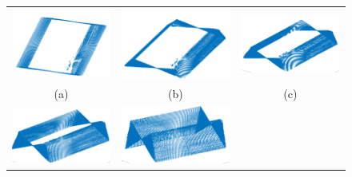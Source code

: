 \begin{figure}[ht!]
     \begin{tabular}{ccc}
        \includegraphics[width=.32\textwidth]{images/caja3D_1.png}&
        \includegraphics[width=.32\textwidth]{images/caja3D_2.png}&
        \includegraphics[width=.32\textwidth]{images/caja3D_3.png}\\
        (a)&(b)&(c)\\
        \includegraphics[width=.32\textwidth]{images/caja3D_4.png}&
        \includegraphics[width=.32\textwidth]{images/caja3D_5.png}&

\end{tabular}
\end{figure}
